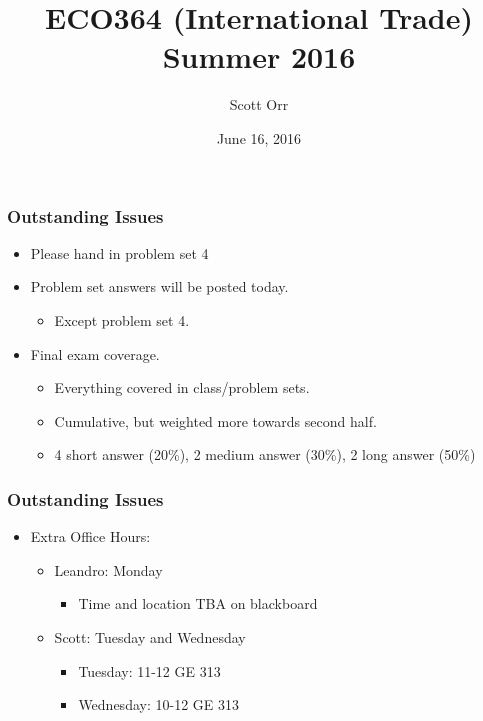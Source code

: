 \documentclass{beamer}
\title{ECO364 (International Trade) Summer 2016}
\date{June 16, 2016}
\author[Scott Orr]{Scott Orr}
\institute{University of Toronto}
\begin{document}
	
	\begin{frame}
		\titlepage
	\end{frame}
	
\begin{frame}
	\frametitle{Outstanding Issues}
\begin{itemize}
	\item Please hand in problem set 4
	\item Problem set answers will be posted today.
		\begin{itemize}
			\item Except problem set 4.
		\end{itemize}
	\item Final exam coverage.
		\begin{itemize}
			\item Everything covered in class/problem sets.
			\item Cumulative, but weighted more towards second half.
			\item 4 short answer (20\%), 2 medium answer (30\%), 2 long answer (50\%) 
		\end{itemize}
\end{itemize}

\end{frame}

\begin{frame}
	\frametitle{Outstanding Issues}
	\begin{itemize}
		\item Extra Office Hours:
		\begin{itemize}
			\item Leandro: Monday
				\begin{itemize}
					\item Time and location TBA on blackboard
				\end{itemize}
			\item Scott: Tuesday and Wednesday
				\begin{itemize}
				\item Tuesday: 11-12  GE 313
				\item Wednesday: 10-12 GE 313
				\end{itemize}
				\end{itemize}
	\end{itemize}
\end{frame}
\end{document}
